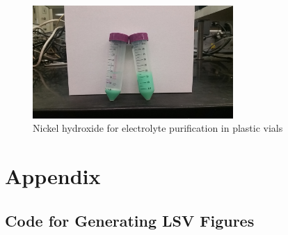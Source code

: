 \documentclass[journal=jpccck,manuscript=suppinfo,email=true]{achemso}
\begin{document}
\begin{figure}[h]
\centering
\includegraphics[width=3in]{./images/apparatus/ni-hydr-purif.png}
\caption{\label{fig-s12}Nickel hydroxide for electrolyte purification in plastic vials}
\end{figure}




\section{Appendix}
\label{sec-6}
\subsection{Code for Generating LSV Figures}
\label{sec-6-1}
\end{document}
